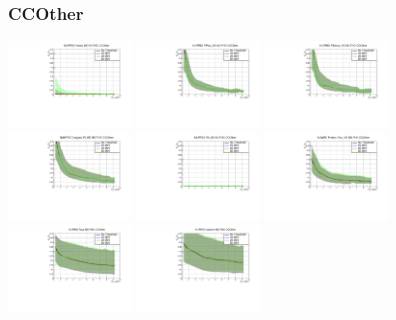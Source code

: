 \subsubsection{CCOther}

\begin{center}

  \includegraphics[width=0.245\textwidth]{plots/Elost_profiles/Proton_KE_FHC_CCOther.pdf}
  \includegraphics[width=0.245\textwidth]{plots/Elost_profiles/PiPlus_KE_FHC_CCOther.pdf}
  \includegraphics[width=0.245\textwidth]{plots/Elost_profiles/PiMinus_KE_FHC_CCOther.pdf}
  \includegraphics[width=0.245\textwidth]{plots/Elost_profiles/Charged_Pi_KE_FHC_CCOther.pdf}
  \includegraphics[width=0.245\textwidth]{plots/Elost_profiles/Pi0_KE_FHC_CCOther.pdf}
  \includegraphics[width=0.245\textwidth]{plots/Elost_profiles/Proton+Pion_KE_FHC_CCOther.pdf}
  \includegraphics[width=0.245\textwidth]{plots/Elost_profiles/Total_FHC_CCOther.pdf}
  \includegraphics[width=0.245\textwidth]{plots/Elost_profiles/Hadrons_FHC_CCOther.pdf}
  

\end{center}
